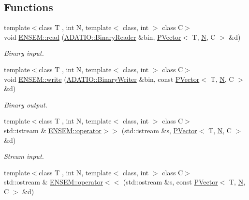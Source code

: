 \subsection*{Functions}
\begin{DoxyCompactItemize}
\item 
{\footnotesize template$<$class T , int N, template$<$ class, int $>$ class C$>$ }\\void \mbox{\hyperlink{group__primvector_ga7490c5f7d1484d1500da031d977a1217}{E\+N\+S\+E\+M\+::read}} (\mbox{\hyperlink{classADATIO_1_1BinaryReader}{A\+D\+A\+T\+I\+O\+::\+Binary\+Reader}} \&bin, \mbox{\hyperlink{classENSEM_1_1PVector}{P\+Vector}}$<$ T, \mbox{\hyperlink{operator__name__util_8cc_a7722c8ecbb62d99aee7ce68b1752f337}{N}}, C $>$ \&d)
\begin{DoxyCompactList}\small\item\em Binary input. \end{DoxyCompactList}\item 
{\footnotesize template$<$class T , int N, template$<$ class, int $>$ class C$>$ }\\void \mbox{\hyperlink{group__primvector_ga06b3a608b1c1724f947b9a83bb506880}{E\+N\+S\+E\+M\+::write}} (\mbox{\hyperlink{classADATIO_1_1BinaryWriter}{A\+D\+A\+T\+I\+O\+::\+Binary\+Writer}} \&bin, const \mbox{\hyperlink{classENSEM_1_1PVector}{P\+Vector}}$<$ T, \mbox{\hyperlink{operator__name__util_8cc_a7722c8ecbb62d99aee7ce68b1752f337}{N}}, C $>$ \&d)
\begin{DoxyCompactList}\small\item\em Binary output. \end{DoxyCompactList}\item 
{\footnotesize template$<$class T , int N, template$<$ class, int $>$ class C$>$ }\\std\+::istream \& \mbox{\hyperlink{group__primvector_ga4bea3f831d6562a5cb0379de835c6843}{E\+N\+S\+E\+M\+::operator$>$$>$}} (std\+::istream \&s, \mbox{\hyperlink{classENSEM_1_1PVector}{P\+Vector}}$<$ T, \mbox{\hyperlink{operator__name__util_8cc_a7722c8ecbb62d99aee7ce68b1752f337}{N}}, C $>$ \&d)
\begin{DoxyCompactList}\small\item\em Stream input. \end{DoxyCompactList}\item 
{\footnotesize template$<$class T , int N, template$<$ class, int $>$ class C$>$ }\\std\+::ostream \& \mbox{\hyperlink{group__primvector_ga6745ec17233acc0af26851238d72789a}{E\+N\+S\+E\+M\+::operator$<$$<$}} (std\+::ostream \&s, const \mbox{\hyperlink{classENSEM_1_1PVector}{P\+Vector}}$<$ T, \mbox{\hyperlink{operator__name__util_8cc_a7722c8ecbb62d99aee7ce68b1752f337}{N}}, C $>$ \&d)

\end{DoxyCompactItemize}
